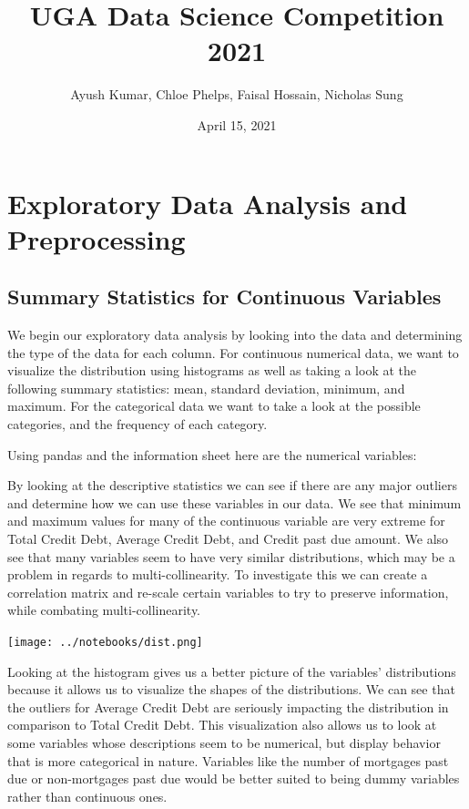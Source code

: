 \documentclass[12pt]{article}
\title{UGA Data Science Competition 2021}
\author{Ayush Kumar, Chloe Phelps, Faisal Hossain, Nicholas Sung}
\date{April 15, 2021}
\begin{document}
 
	
	\maketitle
	\tableofcontents
	\newpage
	
	\section{Exploratory Data Analysis and Preprocessing}
	
	\subsection{Summary Statistics for Continuous Variables}
	
	We begin our exploratory data analysis by looking into the data and determining the type of the data for each column. For continuous numerical data, we want to visualize the distribution using histograms as well as taking a look at the following summary statistics: mean, standard deviation, minimum, and maximum. For the categorical data we want to take a look at the possible categories, and the frequency of each category. 
	
	Using pandas and the information sheet here are the numerical variables: 
	

	
	
	By looking at the descriptive statistics we can see if there are any major outliers and determine how we can use these variables in our data. We see that minimum and maximum values for many of the continuous variable are very extreme for Total Credit Debt, Average Credit Debt, and Credit past due amount. We also see that many variables seem to have very similar distributions, which may be a problem in regards to multi-collinearity. To investigate this we can create a correlation matrix and re-scale certain variables to try to preserve information, while combating multi-collinearity. 
	
	\begin{center}
			\texttt{[image: ../notebooks/dist.png]}
	\end{center}


	Looking at the histogram gives us a better picture of the variables' distributions because it allows us to visualize the shapes of the distributions. We can see that the outliers for Average Credit Debt are seriously impacting the distribution in comparison to Total Credit Debt. This visualization also allows us to look at some variables whose descriptions seem to be numerical, but display behavior that is more categorical in nature. Variables like the number of mortgages past due or non-mortgages past due would be better suited to being dummy variables rather than continuous ones. 
	
\end{document}
